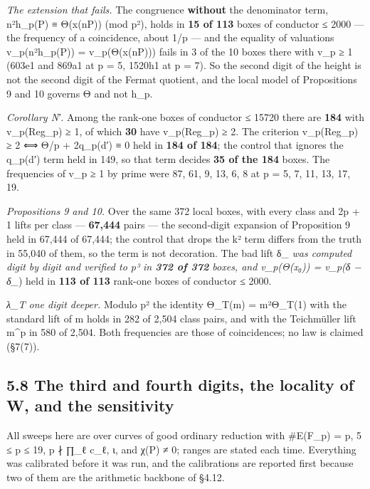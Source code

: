 \documentclass[11pt,a4paper]{article}
\theoremstyle{named}
\begin{document}
\textit{The extension that fails.} The congruence \textbf{without} the denominator term, n²h\_p(P) ≡ Θ(x(nP)) (mod p²), holds in \textbf{15 of 113} boxes of conductor ≤ 2000 — the frequency of a coincidence, about 1/p — and the equality of valuations v\_p(n²h\_p(P)) = v\_p(Θ(x(nP))) fails in 3 of the 10 boxes there with v\_p ≥ 1 (603e1 and 869a1 at p = 5, 1520h1 at p = 7). So the second digit of the height is not the second digit of the Fermat quotient, and the local model of Propositions 9 and 10 governs Θ and not h\_p.

\textit{Corollary N′.} Among the rank-one boxes of conductor ≤ 15720 there are \textbf{184} with v\_p(Reg\_p) ≥ 1, of which \textbf{30} have v\_p(Reg\_p) ≥ 2. The criterion v\_p(Reg\_p) ≥ 2 ⟺ Θ/p + 2q\_p(d′) ≡ 0 held in \textbf{184 of 184}; the control that ignores the q\_p(d′) term held in 149, so that term decides \textbf{35 of the 184} boxes. The frequencies of v\_p ≥ 1 by prime were 87, 61, 9, 13, 6, 8 at p = 5, 7, 11, 13, 17, 19.

\textit{Propositions 9 and 10.} Over the same 372 local boxes, with every class and 2p + 1 lifts per class — \textbf{67,444} pairs — the second-digit expansion of Proposition 9 held in 67,444 of 67,444; the control that drops the k² term differs from the truth in 55,040 of them, so the term is not decoration. The bad lift δ\_\textit{ was computed digit by digit and verified to p³ in \textbf{372 of 372} boxes, and v\_p(Θ(x₀)) = v\_p(δ − δ\_}) held in \textbf{113 of 113} rank-one boxes of conductor ≤ 2000.

\textit{λ\_T one digit deeper.} Modulo p² the identity Θ\_T(m) = m²Θ\_T(1) with the standard lift of m holds in 282 of 2,504 class pairs, and with the Teichmüller lift m\textasciicircum{}p in 580 of 2,504. Both frequencies are those of coincidences; no law is claimed (§7(7)).

\subsection*{5.8 The third and fourth digits, the locality of W, and the sensitivity}

All sweeps here are over curves of good ordinary reduction with \#E(F\_p) = p, 5 ≤ p ≤ 19, p ∤ ∏\_ℓ c\_ℓ, ι, and χ(P) ≠ 0; ranges are stated each time. Everything was calibrated before it was run, and the calibrations are reported first because two of them are the arithmetic backbone of §4.12.
\end{document}
